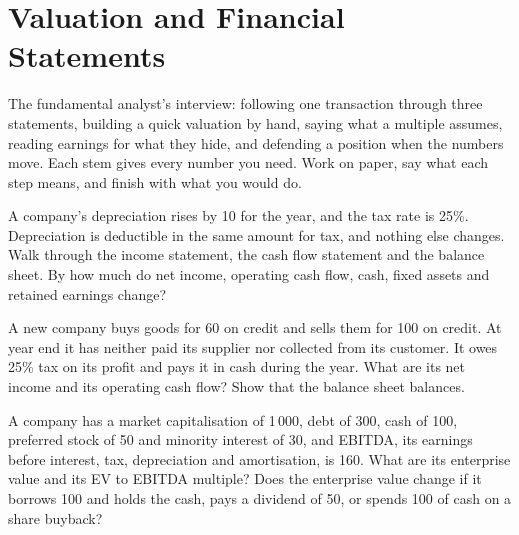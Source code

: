 \chapter{Valuation and Financial Statements}\label{ch:iv2:valuation-and-financial-statements}

\begin{ivtrains}
The fundamental analyst's interview: following one transaction through three statements, building a quick valuation by hand, saying what a multiple assumes, reading earnings for what they hide, and defending a position when the numbers move. Each stem gives every number you need. Work on paper, say what each step means, and finish with what you would do.
\end{ivtrains}

\begin{question}\label{iq:iv2:valuation-and-financial-statements:1}
A company's depreciation rises by 10 for the year, and the tax rate is 25\%. Depreciation is deductible in the same amount for tax, and nothing else changes. Walk through the income statement, the cash flow statement and the balance sheet. By how much do net income, operating cash flow, cash, fixed assets and retained earnings change?
\end{question}

\begin{question}\label{iq:iv2:valuation-and-financial-statements:2}
A new company buys goods for 60 on credit and sells them for 100 on credit. At year end it has neither paid its supplier nor collected from its customer. It owes 25\% tax on its profit and pays it in cash during the year. What are its net income and its operating cash flow? Show that the balance sheet balances.
\end{question}

\begin{question}\label{iq:iv2:valuation-and-financial-statements:3}
A company has a market capitalisation of 1\,000, debt of 300, cash of 100, preferred stock of 50 and minority interest of 30, and EBITDA, its earnings before interest, tax, depreciation and amortisation, is 160. What are its enterprise value and its EV to EBITDA multiple? Does the enterprise value change if it borrows 100 and holds the cash, pays a dividend of 50, or spends 100 of cash on a share buyback?
\end{question}


